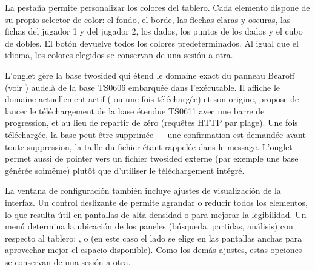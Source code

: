\documentclass[letterpaper,10pt,spanish]{sphinxmanual}
\begin{document}
\sphinxAtStartPar
La pestaña  permite personalizar los colores del tablero. Cada elemento dispone de su propio selector de color: el fondo, el borde, las flechas claras y oscuras, las fichas del jugador 1 y del jugador 2, los dados, los puntos de los dados y el cubo de dobles. El botón  devuelve todos los colores predeterminados. Al igual que el idioma, los colores elegidos se conservan de una sesión a otra.

\sphinxAtStartPar
L’onglet  gère la base two\sphinxhyphen{}sided qui étend le domaine exact du
panneau Bearoff (voir {\hyperref[\detokenize{manuel:panneau-epc}]{}}) au\sphinxhyphen{}delà de la base TS\sphinxhyphen{}06\sphinxhyphen{}06
embarquée dans l’exécutable. Il affiche le domaine actuellement actif
( ou  une fois téléchargée) et son origine, propose de
lancer le téléchargement de la base étendue TS\sphinxhyphen{}06\sphinxhyphen{}11 avec une barre de
progression, et  au
lieu de repartir de zéro (requêtes HTTP par plage). Une fois téléchargée, la
base peut être supprimée — une confirmation est demandée avant toute
suppression, la taille du fichier étant rappelée dans le message. L’onglet
permet aussi de pointer vers un fichier  two\sphinxhyphen{}sided externe (par exemple
une base générée soi\sphinxhyphen{}même) plutôt que d’utiliser le téléchargement intégré.

\sphinxAtStartPar
La ventana de configuración también incluye ajustes de visualización de la interfaz. Un control deslizante de  permite agrandar o reducir todos los elementos, lo que resulta útil en pantallas de alta densidad o para mejorar la legibilidad. Un menú  determina la ubicación de los paneles (búsqueda, partidas, análisis) con respecto al tablero: ,  o  (en este caso el lado se elige en las pantallas anchas para aprovechar mejor el espacio disponible). Como los demás ajustes, estas opciones se conservan de una sesión a otra.
\end{document}
